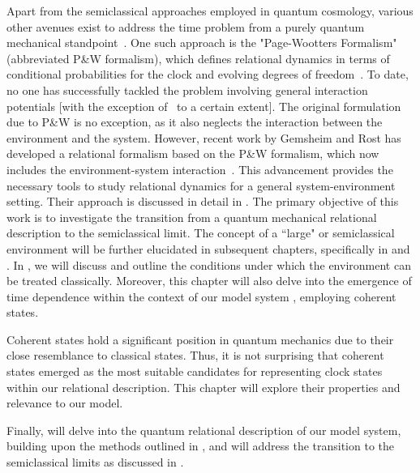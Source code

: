 Apart from the semiclassical approaches employed in quantum cosmology, various other avenues 
exist to address the time problem from a purely quantum mechanical standpoint~\cite{hohn2021trinity}. 
One such approach is the "Page-Wootters Formalism" (abbreviated P\&W formalism), which defines 
relational dynamics in terms of conditional probabilities for the clock and evolving degrees of 
freedom~\cite{page1983evolution}. To date, no one has successfully tackled the problem involving 
general interaction potentials [with the exception of~\cite{Smith:2017pwx} to a certain extent]. 
The original formulation due to P\&W is no exception, as it also neglects the interaction between 
the environment and the system. However, recent work by Gemsheim and Rost has developed a relational 
formalism based on the P\&W formalism, which now includes the environment-system 
interaction~\cite{Gemsheim:2023izg}. This advancement provides the necessary tools to study 
relational dynamics for a general system-environment setting. Their approach is discussed in 
detail in . The primary objective of this work is to investigate the transition from a quantum mechanical 
relational description to the semiclassical limit. The concept of a ``large" or semiclassical 
environment will be further elucidated in subsequent chapters, specifically in 
 and . 
In , we will discuss and outline the conditions 
under which the environment can be treated classically. Moreover, this chapter will 
also delve into the emergence of time dependence within the context of our model system
, employing coherent states.

Coherent states hold a significant position in quantum mechanics due to their close 
resemblance to classical states. Thus, it is not surprising that coherent states 
emerged as the most suitable candidates for representing clock states within our 
relational description. This chapter will explore their properties and relevance 
to our model.

Finally,  will delve into the quantum relational 
description of our model system, building upon the methods outlined in 
, and will address the transition to the semiclassical 
limits as discussed in .

\newpage